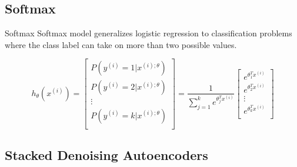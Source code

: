 \documentclass{beamer}
\begin{document}
\subsection{Softmax}
\begin{frame}{Softmax}
Softmax model generalizes logistic regression to classification problems where the class label can take on more than two possible values. 

\begin{equation*}
h_{\theta}(x^{(i)})=
\left[\begin{array}{cccc}
P(y^{(i)}=1|x^{(i);\theta})\\
P(y^{(i)}=2|x^{(i);\theta})\\
\vdots\\
P(y^{(i)}=k|x^{(i);\theta})\\
\end{array}\right]
=\frac{1}{\sum^k_{j=1}e^{\theta^T_j x^{(i)}}}
\left[\begin{array}{cccc}
e^{\theta_1^T x^{(i)}}\\
e^{\theta_2^T x^{(i)}}\\
\vdots\\
e^{\theta_k^T x^{(i)}}\\
\end{array}\right]
\end{equation*}



\end{frame}

\subsection{Stacked Denoising Autoencoders}
\end{document}
